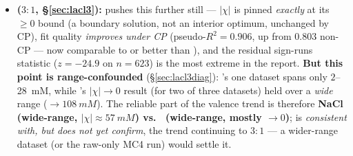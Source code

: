 \documentclass[11pt]{article}
\begin{document}
\begin{itemize}[itemsep=2pt]
        overturns this.
  \item \textbf{ ($3{:}1$, \S\ref{sec:lacl3}):} pushes this further
        still --- $|\chi|$ is pinned \emph{exactly} at its $\ge0$ bound (a
        boundary solution, not an interior optimum, unchanged by CP), fit quality
        \emph{improves under CP} (pseudo-$R^2=0.906$, up from $0.803$
        non-CP --- now comparable to or better than ), and the
        residual sign-runs statistic ($z=-24.9$ on $n=623$) is the most
        extreme in the report. \textbf{But this point is range-confounded}
        (\S\ref{sec:lacl3diag}): 's one dataset spans only
        $2$--\SI{28}{mM}, while 's $|\chi|\to0$ result (for two of
        three datasets) held over a
        \emph{wide} range ($\to\SI{108}{mM}$). The reliable part of the
        valence trend is therefore \textbf{NaCl (wide-range,
        $|\chi|\approx\SI{57}{mM}$) vs.\  (wide-range, mostly $\to0$)};
         is \emph{consistent with, but does not yet confirm}, the
        trend continuing to $3{:}1$ --- a wider-range  dataset (or
        the raw-only MC4 run) would settle it.
\end{itemize}
\end{document}
